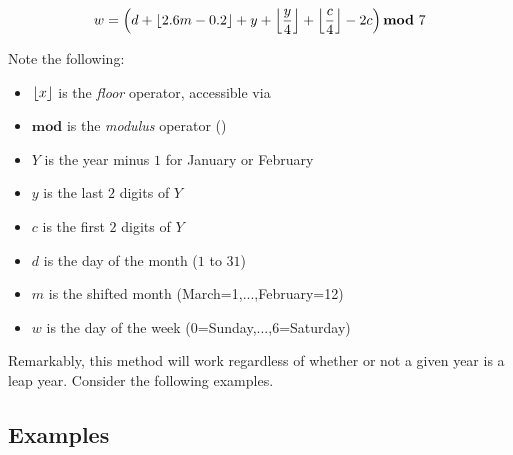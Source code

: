 		\[
			w = \left(d + \floor{2.6m - 0.2} + y + \floor{\dfrac{y}{4}} + \floor{\dfrac{c}{4}} - 2c\right) \mathbf{mod}\ 7
		\]

		Note the following:
		\begin{itemize}
			\item $\left\lfloor x \right\rfloor$ is the \emph{floor} operator, accessible via 
			\item $\mathbf{mod}$ is the \emph{modulus} operator (\code{\%})
			\item $Y$ is the year minus $1$ for January or February
			\item $y$ is the last $2$ digits of $Y$
			\item $c$ is the first $2$ digits of $Y$
			\item $d$ is the day of the month ($1$ to $31$)
			\item $m$ is the shifted month (March=1,...,February=12)
			\item $w$ is the day of the week (0=Sunday,...,6=Saturday)
		\end{itemize}

		Remarkably, this method will work regardless of whether or not a given year is a leap year. Consider the following examples.
	
		\subsection{Examples}
			\ \\[18pt]
			\ \\[18pt]

	\pagebreak

